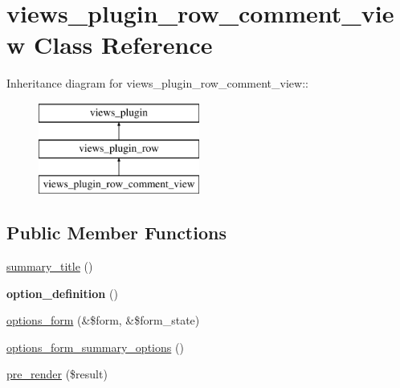 \hypertarget{classviews__plugin__row__comment__view}{
\section{views\_\-plugin\_\-row\_\-comment\_\-view Class Reference}
\label{classviews__plugin__row__comment__view}
}
Inheritance diagram for views\_\-plugin\_\-row\_\-comment\_\-view::\begin{figure}[H]
\begin{center}
\leavevmode
\includegraphics[height=3cm]{classviews__plugin__row__comment__view}
\end{center}
\end{figure}
\subsection*{Public Member Functions}
\begin{DoxyCompactItemize}
\item 
\hyperlink{classviews__plugin__row__comment__view_a8f87e8baac2cbe47fa187c739decc88f}{summary\_\-title} ()
\item 
\hypertarget{classviews__plugin__row__comment__view_aec46add7efd08b097100a4cc6d60b50e}{
{\bfseries option\_\-definition} ()}
\label{classviews__plugin__row__comment__view_aec46add7efd08b097100a4cc6d60b50e}

\item 
\hyperlink{classviews__plugin__row__comment__view_a7dd276ec1a14a2d34f80a8020557608a}{options\_\-form} (\&\$form, \&\$form\_\-state)
\item 
\hyperlink{classviews__plugin__row__comment__view_a6a7748a2ceb8f5ebac1d59f94800b89a}{options\_\-form\_\-summary\_\-options} ()
\item 
\hyperlink{classviews__plugin__row__comment__view_a0cb891a0afff2975d9a04c9d879ee5a5}{pre\_\-render} (\$result)
\end{DoxyCompactItemize}
